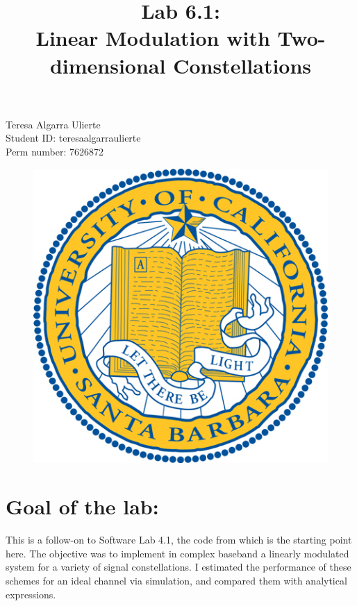 \documentclass[a4paper,11pt]{article}
\title{\bfseries Lab 6.1: \\ Linear Modulation with Two-dimensional Constellations\\}
\date{}
\begin{document}
\renewcommand\contentsname{\vspace{-1cm}}
\maketitle
\lstset{language=Matlab}

\begin{centering}
    Teresa Algarra Ulierte \\
    Student ID: teresaalgarraulierte \\
    Perm number: 7626872 \\
\end{centering}

\vspace{3cm}

\begin{figure}[!ht]
	\centering
	\includegraphics[scale = 5]{images/portada.jpeg}
\end{figure}

\newpage

\section{Goal of the lab:}

This is a follow-on to Software Lab 4.1, the code from which is the starting
point here. The objective was to implement in complex baseband a linearly
modulated system for a variety of signal constellations. I estimated the
performance of these schemes for an ideal channel via simulation, and compared
them with analytical expressions.
\end{document}
